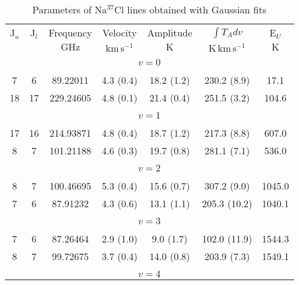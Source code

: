 \begin{table*}[htp]
\centering
\caption{Parameters of Na$^{37}$Cl lines obtained with Gaussian fits}
\begin{tabular}{ccccccc}
\label{tab:Na37Cl_salt_lines}
 J$_u$ & J$_l$ & Frequency & Velocity & Amplitude & $\int T_A dv$ & E$_U$ \\
  &  & $\mathrm{GHz}$ & $\mathrm{km\,s^{-1}}$ & $\mathrm{K}$ & $\mathrm{K\,km\,s^{-1}}$ & $\mathrm{K}$ \\
\hline
&\vspace{-0.75em}\\
\multicolumn{7}{c}{$v = 0$} \\
\vspace{-0.75em}\\
 7 & 6 & 89.22011 & 4.3 (0.4) & 18.2 (1.2) & 230.2 (8.9) & 17.1 \\
 18 & 17 & 229.24605 & 4.8 (0.1) & 21.4 (0.4) & 251.5 (3.2) & 104.6 \\
&\vspace{-0.75em}\\
\multicolumn{7}{c}{$v = 1$} \\
\vspace{-0.75em}\\
 17 & 16 & 214.93871 & 4.8 (0.4) & 18.7 (1.2) & 217.3 (8.8) & 607.0 \\
 8 & 7 & 101.21188 & 4.6 (0.3) & 19.7 (0.8) & 281.1 (7.1) & 536.0 \\
&\vspace{-0.75em}\\
\multicolumn{7}{c}{$v = 2$} \\
\vspace{-0.75em}\\
 8 & 7 & 100.46695 & 5.3 (0.4) & 15.6 (0.7) & 307.2 (9.0) & 1045.0 \\
 7 & 6 & 87.91232 & 4.3 (0.6) & 13.1 (1.1) & 205.3 (10.2) & 1040.1 \\
&\vspace{-0.75em}\\
\multicolumn{7}{c}{$v = 3$} \\
\vspace{-0.75em}\\
 7 & 6 & 87.26464 & 2.9 (1.0) & 9.0 (1.7) & 102.0 (11.9) & 1544.3 \\
 8 & 7 & 99.72675 & 3.7 (0.4) & 14.0 (0.8) & 203.9 (7.3) & 1549.1 \\
&\vspace{-0.75em}\\
\multicolumn{7}{c}{$v = 4$} \\

\end{tabular}
\end{table*}
